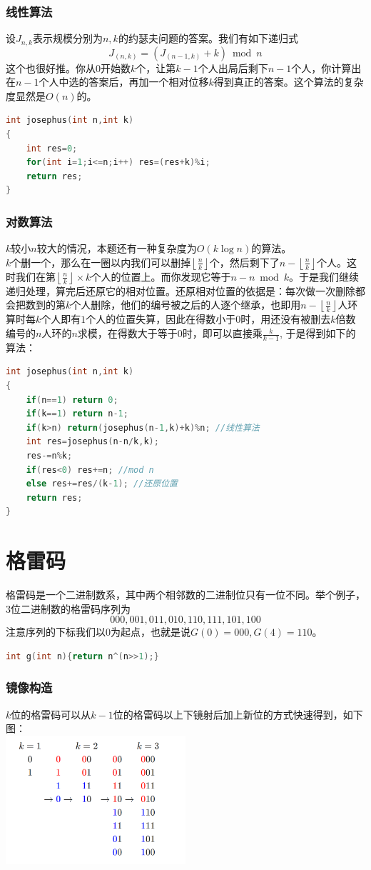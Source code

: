 \documentclass[a4paper]{book}
\begin{document}
\subsubsection{线性算法}
设$J_{n,k}$表示规模分别为$n,k$的约瑟夫问题的答案。我们有如下递归式
$$
J_{(n,k)}=(J_{(n-1,k)}+k)\bmod n
$$
这个也很好推。你从$0$开始数$k$个，让第$k-1$个人出局后剩下$n-1$个人，你计算出在$n-1$个人中选的答案后，再加一个相对位移$k$得到真正的答案。这个算法的复杂度显然是$O(n)$的。
\begin{lstlisting}[language=c++]
int josephus(int n,int k) 
{
    int res=0;
    for(int i=1;i<=n;i++) res=(res+k)%i;
    return res;
}
\end{lstlisting}
\subsubsection{对数算法}
$k$较小$n$较大的情况，本题还有一种复杂度为$O(k\log n)$的算法。\\
$k$个删一个，那么在一圈以内我们可以删掉$\left\lfloor\frac{n}{k}\right\rfloor$个，然后剩下了$n-\left\lfloor\frac{n}{k}\right\rfloor$个人。这时我们在第$\left\lfloor\frac{n}{k}\right\rfloor\times k$个人的位置上。而你发现它等于$n-n\bmod k$。于是我们继续递归处理，算完后还原它的相对位置。还原相对位置的依据是：每次做一次删除都会把数到的第$k$个人删除，他们的编号被之后的人逐个继承，也即用$n-\left\lfloor\frac{n}{k}\right\rfloor$人环算时每$k$个人即有$1$个人的位置失算，因此在得数小于$0$时，用还没有被删去$k$倍数编号的$n$人环的$n$求模，在得数大于等于$0$时，即可以直接乘$\frac{k}{k-1}$, 于是得到如下的算法：
\begin{lstlisting}[language=c++]
int josephus(int n,int k) 
{
    if(n==1) return 0;
    if(k==1) return n-1;
    if(k>n) return(josephus(n-1,k)+k)%n; //线性算法
    int res=josephus(n-n/k,k);
    res-=n%k;
    if(res<0) res+=n; //mod n
    else res+=res/(k-1); //还原位置
    return res;
}
\end{lstlisting}
\section{格雷码}
格雷码是一个二进制数系，其中两个相邻数的二进制位只有一位不同。举个例子，$3$位二进制数的格雷码序列为
$$
000,001,011,010,110,111,101,100
$$
注意序列的下标我们以$0$为起点，也就是说$G(0)=000,G(4)=110$。
\begin{lstlisting}[language=c++]
int g(int n){return n^(n>>1);}
\end{lstlisting}
\subsubsection{镜像构造}
$k$位的格雷码可以从$k-1$位的格雷码以上下镜射后加上新位的方式快速得到，如下图：\\
\includegraphics[width=0.5\textwidth,center]{../photo/gray.png}
\end{document}

